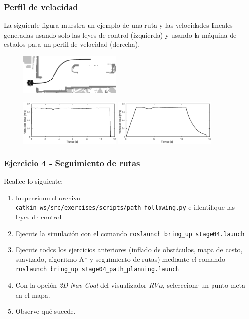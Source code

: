 \documentclass[10pt,spanish,aspectratio=1610]{beamer}
\begin{document}
\begin{frame}\frametitle{Perfil de velocidad}
  La siguiente figura muestra un ejemplo de una ruta y las velocidades lineales generadas usando solo las leyes de control (izquierda) y usando la máquina de estados para un perfil de velocidad (derecha). 
  \begin{figure}
    \centering
    \includegraphics[width=0.45\textwidth]{Figures/SpeedProfilePath.png}
  \end{figure}
  \begin{figure}
    \centering
    \includegraphics[width=0.45\textwidth]{Figures/SpeedWithoutProfile.eps}
    \includegraphics[width=0.45\textwidth]{Figures/SpeedWithProfile.eps}
  \end{figure}
\end{frame}

\begin{frame}[containsverbatim]\frametitle{Ejercicio 4 - Seguimiento de rutas}
Realice lo siguiente:
  \begin{enumerate}
     \item Inspeccione el archivo \texttt{catkin\_ws/src/exercises/scripts/path\_following.py} e identifique las leyes de control. 
  \item Ejecute la simulación con el comando \texttt{roslaunch bring\_up stage04.launch}
  \item Ejecute todos los ejercicios anteriores (inflado de obstáculos, mapa de costo, suavizado, algoritmo A* y seguimiento de rutas) mediante el comando\\ \texttt{roslaunch bring\_up stage04\_path\_planning.launch}
  \item Con la opción \textit{2D Nav Goal} del visualizador \textit{RViz}, selecccione un punto meta en el mapa.
  \item Observe qué sucede. 
  \end{enumerate}
\end{frame}
\end{document}
